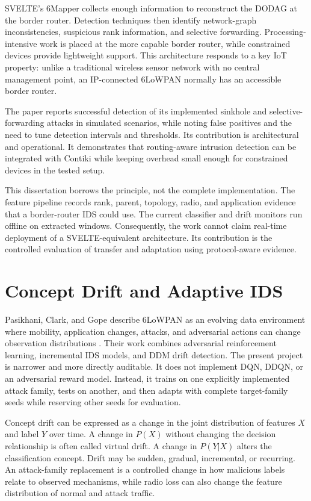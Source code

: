 SVELTE's 6Mapper collects enough information to reconstruct the DODAG at the border router. Detection techniques then identify network-graph inconsistencies, suspicious rank information, and selective forwarding. Processing-intensive work is placed at the more capable border router, while constrained devices provide lightweight support. This architecture responds to a key IoT property: unlike a traditional wireless sensor network with no central management point, an IP-connected 6LoWPAN normally has an accessible border router.

The paper reports successful detection of its implemented sinkhole and selective-forwarding attacks in simulated scenarios, while noting false positives and the need to tune detection intervals and thresholds. Its contribution is architectural and operational. It demonstrates that routing-aware intrusion detection can be integrated with Contiki while keeping overhead small enough for constrained devices in the tested setup.

This dissertation borrows the principle, not the complete implementation. The feature pipeline records rank, parent, topology, radio, and application evidence that a border-router IDS could use. The current classifier and drift monitors run offline on extracted windows. Consequently, the work cannot claim real-time deployment of a SVELTE-equivalent architecture. Its contribution is the controlled evaluation of transfer and adaptation using protocol-aware evidence.

\section{Concept Drift and Adaptive IDS}

Pasikhani, Clark, and Gope describe 6LoWPAN as an evolving data environment where mobility, application changes, attacks, and adversarial actions can change observation distributions \cite{pasikhani2022arl}. Their work combines adversarial reinforcement learning, incremental IDS models, and DDM drift detection. The present project is narrower and more directly auditable. It does not implement DQN, DDQN, or an adversarial reward model. Instead, it trains on one explicitly implemented attack family, tests on another, and then adapts with complete target-family seeds while reserving other seeds for evaluation.

Concept drift can be expressed as a change in the joint distribution of features $X$ and label $Y$ over time. A change in $P(X)$ without changing the decision relationship is often called virtual drift. A change in $P(Y|X)$ alters the classification concept. Drift may be sudden, gradual, incremental, or recurring. An attack-family replacement is a controlled change in how malicious labels relate to observed mechanisms, while radio loss can also change the feature distribution of normal and attack traffic.

